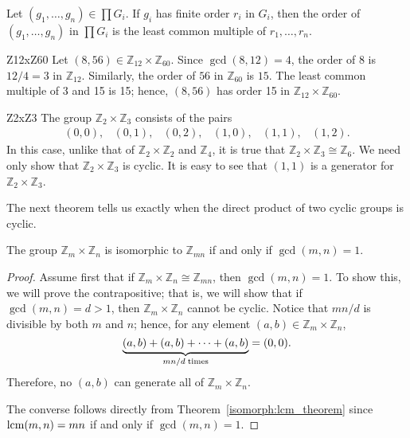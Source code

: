 \begin{corollary}
Let $(g_1, \ldots, g_n) \in \prod G_i$. If $g_i$ has finite order
$r_i$ in $G_i$, then the order of $(g_1, \ldots, g_n)$ in $\prod G_i$
is the least common multiple of $r_1, \ldots, r_n$.
\end{corollary}
 
 
\begin{example}{Z12xZ60}
Let $(8, 56) \in {\mathbb Z}_{12} \times  {\mathbb Z}_{60}$. Since
$\gcd(8,12) = 4$, the order of 8 is $12/4 = 3$ in ${\mathbb Z}_{12}$.
Similarly, the order of $56$ in ${\mathbb Z}_{60}$ is $15$. The least
common multiple of 3 and 15 is 15; hence, $(8, 56)$ has order 15 in
${\mathbb Z}_{12} \times  {\mathbb Z}_{60}$.
\end{example}

 
\begin{example}{Z2xZ3}
The group ${\mathbb Z}_2 \times {\mathbb Z}_3$ consists of the pairs
\[
\begin{array}{cccccc}
(0,0),& (0, 1),& (0, 2),& (1,0),& (1, 1),& (1, 2).
\end{array}
\]
In this case, unlike that of ${\mathbb Z}_2 \times {\mathbb Z}_2$ and
${\mathbb Z}_4$, it 
is true that ${\mathbb Z}_2  \times {\mathbb Z}_3 \cong {\mathbb Z}_6$. We need
only show that ${\mathbb Z}_2  \times {\mathbb Z}_3$ is cyclic.  It is
easy to see that $(1,1)$ is a generator for ${\mathbb Z}_2  \times {\mathbb
Z}_3$. 
\end{example}

 
The next theorem tells us exactly when the direct product of two
cyclic groups is cyclic. 
 

\begin{theorem}\label{Z_pq_theorem}
The group ${\mathbb Z}_m \times {\mathbb Z}_n$ is isomorphic to ${\mathbb
Z}_{mn}$ if and only if $\gcd(m,n)=1$. 
\end{theorem}
 

\begin{proof}
Assume first that if ${\mathbb Z}_m \times {\mathbb Z}_n \cong {\mathbb
Z}_{mn}$, then $\gcd(m, n) = 1$. To show this, we will prove the
contrapositive; that is, we will show that if $\gcd(m, n) = d >
1$, then ${\mathbb Z}_m \times {\mathbb Z}_n$ cannot be cyclic. Notice that
$mn/d$ is divisible by both $m$ and $n$; hence, for any element $(a,b)
\in {\mathbb Z}_m \times {\mathbb Z}_n$,  
\[
\underbrace{(a,b) + (a,b)+ \cdots + (a,b)}_{mn/d \; {\rm
times}}
= (0, 0).
\]
Therefore, no $(a, b)$ can generate all of ${\mathbb Z}_m \times {\mathbb
Z}_n$. 

 
The converse follows directly from Theorem~\ref{isomorph:lcm_theorem} since
$\operatorname{lcm}(m,n) = mn$ if and only if $\gcd(m,n)=1$. 
\end{proof}
 

